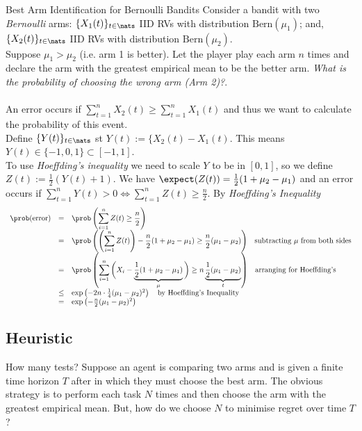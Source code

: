 \documentclass[11pt,a4paper]{article}
\begin{document}
\begin{example}{Best Arm Identification for Bernoulli Bandits}
  Consider a bandit with two \textit{Bernoulli} arms: $\{X_1(t)\}_{t\in\nats}$ IID RVs with distribution $\text{Bern}(\mu_1)$; and, $\{X_2(t)\}_{t\in\nats}$ IID RVs with distribution $\text{Bern}(\mu_2)$. \\
  Suppose $\mu_1>\mu_2$ (i.e. arm 1 is better). Let the player play each arm $n$ times and declare the arm with the greatest empirical mean to be the better arm. \textit{What is the probability of choosing the wrong arm (Arm 2)?}.\\
  \\
  An error occurs if $\sum_{t=1}^nX_2(t)\geq\sum_{t=1}^nX_1(t)$ and thus we want to calculate the probability of this event.\\
  Define $\{Y(t)\}_{t\in\nats}$ st $Y(t):=\{X_2(t)-X_1(t)$. This means $Y(t)\in\{-1,0,1\}\subset[-1,1]$.\\
  To use \textit{Hoeffding's inequality} we need to scale $Y$ to be in $[0,1]$, so we define $Z(t):=\frac12(Y(t)+1)$. We have $\expect(Z(t))=\frac12(1+\mu_2-\mu_1)$ and an error occurs if $\sum_{t=1}^nY(t)>0\Longleftrightarrow \sum_{t=1}^nZ(t)\geq\frac{n}2$. By \textit{Hoeffding's Inequality}
  \[\begin{array}{rclll}
    \prob(\text{error})&=&\displaystyle\prob\left(\sum_{i=1}^nZ(t)\geq\frac{n}2\right)\\
    &=&{\displaystyle\prob\left(\left(\sum_{i=1}^nZ(t)\right)-\frac{n}2(1+\mu_2-\mu_1)\geq\frac{n}2(\mu_1-\mu_2)\right)}\quad\text{subtracting $\mu$ from both sides}\\
    &=&{\displaystyle\prob\left(\sum_{i=1}^n\bigg(X_i-\underbrace{\frac{1}{2}(1+\mu_2-\mu_1)}_\mu\bigg)\geq n\underbrace{\frac12(\mu_1-\mu_2)}_t\right)}\quad\text{arranging for Hoeffding's}\\
    &\leq&\exp\left(-2n\cdot\frac{1}4(\mu_1-\mu_2)^2\right)\quad\text{by Hoeffding's Inequality}\\
    &=&\exp\left(-\frac{n}2(\mu_1-\mu_2)^2\right)
  \end{array}\]
\end{example}

\subsection{Heuristic}

\begin{remark}{How many tests?}
  Suppose an agent is comparing two arms and is given a finite time horizon $T$ after in which they must choose the best arm. The obvious strategy is to perform each task $N$ times and then choose the arm with the greatest empirical mean. But, how do we choose $N$ to minimise regret over time $T$?
\end{remark}
\end{document}
